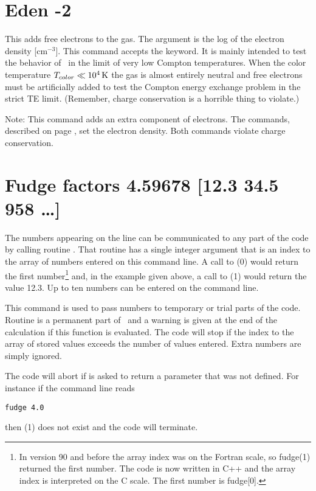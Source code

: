 \section{Eden -2}
\label{sec:CommandEden}

This adds free electrons to the gas.
The argument is the log of the
electron density [cm$^{-3}$].
This command accepts the  keyword.
It is mainly intended to test the
behavior of \Cloudy\ in the limit of very low Compton temperatures.
When
the color temperature $T_{color} \ll 10^4 {\rm\thinspace K}$ the gas is almost
entirely neutral
and free electrons must be artificially added to test the Compton energy
exchange problem in the strict TE limit.
(Remember, charge conservation is a horrible thing to violate.)

Note:  This command adds an extra component of electrons.
The  commands,
described on page \pageref{sec:CommandSetEden}, set the electron density.
Both commands violate charge conservation.

\section{Fudge factors 4.59678 [12.3 34.5 958 \dots]}

The numbers appearing on the line can be communicated to any part of
the code by calling routine .
That routine has a single integer
argument that is an index to the array of numbers entered on this command
line.
A call to (0) would return the first number\footnote{In version 90 and before the array index was on the Fortran scale,
so fudge(1) returned the first number.  The code is now written in C++ and
the array index is interpreted on the C scale.  The first number is fudge[0].} and, in the
example given above, a call to (1) would return the value 12.3.
Up to ten numbers can be entered on the command line.

This command is used to pass numbers to temporary or trial parts of the
code.  Routine  is a permanent part of \Cloudy\ and
a warning is given
at the end of the calculation if this function is evaluated.
The code will
stop if the index to the array of stored values exceeds
the number of values
entered.
Extra numbers are simply ignored.

The code will abort if  is asked to return
a parameter that was not defined.
For instance if the command line reads
\begin{verbatim}
fudge 4.0
\end{verbatim}
then (1) does not exist and the code will terminate.


